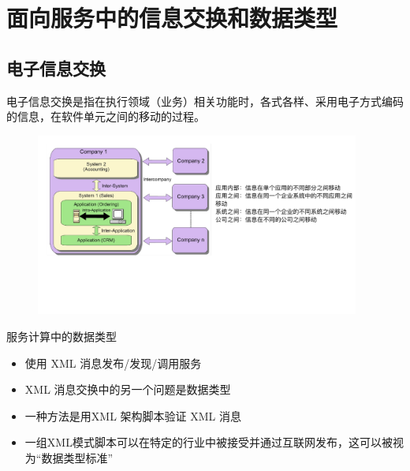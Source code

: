 \section{面向服务中的信息交换和数据类型}

\subsection{电子信息交换}
电子信息交换是指在执行领域（业务）相关功能时，各式各样、采用电子方式编码的信息，在软件单元之间的移动的过程。

\begin{figure}[H]
    \vspace{-0.5em}
	\centering
	\includegraphics[width=0.95\textwidth]{images/Electronic Information Exchange.pdf}
    \vspace{-1em}
\end{figure}

服务计算中的数据类型
\vspace{-0.8em}
\begin{multicols}{2}
    \begin{itemize}
        \item 使用 XML 消息发布/发现/调用服务
        \item XML 消息交换中的另一个问题是数据类型
        \item 一种方法是用XML 架构脚本验证 XML 消息
        \item 一组XML模式脚本可以在特定的行业中被接受并通过互联网发布，这可以被视为“数据类型标准”
    \end{itemize}
\end{multicols}
\vspace{-1em}

